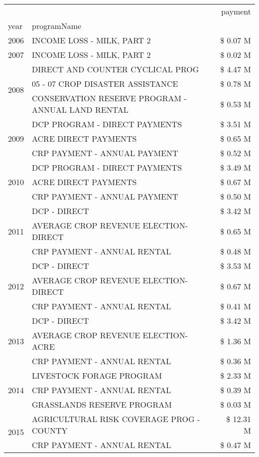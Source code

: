 \begin{tabular}{llr}
\toprule
 &  & payment \\
year & programName &  \\
\midrule
2006 & INCOME LOSS - MILK, PART 2 & \$ 0.07 M \\
\cline{1-3}
2007 & INCOME LOSS - MILK, PART 2 & \$ 0.02 M \\
\cline{1-3}
\multirow[t]{3}{*}{2008} & DIRECT AND COUNTER CYCLICAL PROG & \$ 4.47 M \\
 & 05 - 07 CROP DISASTER ASSISTANCE & \$ 0.78 M \\
 & CONSERVATION RESERVE PROGRAM - ANNUAL LAND RENTAL & \$ 0.53 M \\
\cline{1-3}
\multirow[t]{3}{*}{2009} & DCP PROGRAM - DIRECT PAYMENTS & \$ 3.51 M \\
 & ACRE DIRECT PAYMENTS & \$ 0.65 M \\
 & CRP PAYMENT - ANNUAL PAYMENT & \$ 0.52 M \\
\cline{1-3}
\multirow[t]{3}{*}{2010} & DCP PROGRAM - DIRECT PAYMENTS & \$ 3.49 M \\
 & ACRE DIRECT PAYMENTS & \$ 0.67 M \\
 & CRP PAYMENT - ANNUAL PAYMENT & \$ 0.50 M \\
\cline{1-3}
\multirow[t]{3}{*}{2011} & DCP - DIRECT & \$ 3.42 M \\
 & AVERAGE CROP REVENUE ELECTION-DIRECT & \$ 0.65 M \\
 & CRP PAYMENT - ANNUAL RENTAL & \$ 0.48 M \\
\cline{1-3}
\multirow[t]{3}{*}{2012} & DCP - DIRECT & \$ 3.53 M \\
 & AVERAGE CROP REVENUE ELECTION-DIRECT & \$ 0.67 M \\
 & CRP PAYMENT - ANNUAL RENTAL & \$ 0.41 M \\
\cline{1-3}
\multirow[t]{3}{*}{2013} & DCP - DIRECT & \$ 3.42 M \\
 & AVERAGE CROP REVENUE ELECTION-ACRE & \$ 1.36 M \\
 & CRP PAYMENT - ANNUAL RENTAL & \$ 0.36 M \\
\cline{1-3}
\multirow[t]{3}{*}{2014} & LIVESTOCK FORAGE PROGRAM & \$ 2.33 M \\
 & CRP PAYMENT - ANNUAL RENTAL & \$ 0.39 M \\
 & GRASSLANDS RESERVE PROGRAM & \$ 0.03 M \\
\cline{1-3}
\multirow[t]{3}{*}{2015} & AGRICULTURAL RISK COVERAGE PROG - COUNTY & \$ 12.31 M \\
 & CRP PAYMENT - ANNUAL RENTAL & \$ 0.47 M \\

\end{tabular}
